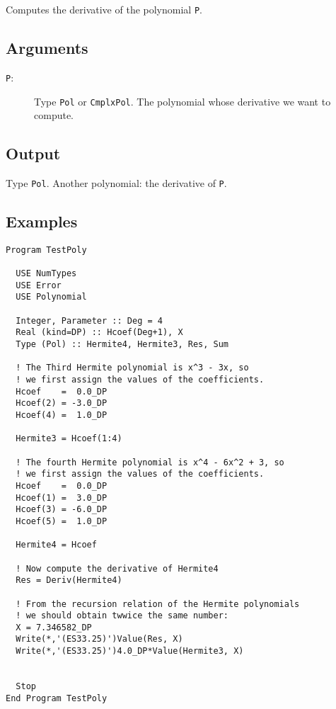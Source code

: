 Computes the derivative of the polynomial \texttt{P}.

\subsection{Arguments}

\begin{description}
\item[\texttt{P}:] Type \texttt{Pol} or \texttt{CmplxPol}. The
  polynomial whose derivative we want to compute.
\end{description}

\subsection{Output}

Type \texttt{Pol}. Another polynomial: the derivative of \texttt{P}.

\subsection{Examples}

\begin{lstlisting}[emph=Deriv,
                   emphstyle=\color{blue},
                   frame=trBL,
                   caption=Computing the derivative of a polynomial.,
                   label=derivpol]
Program TestPoly

  USE NumTypes
  USE Error
  USE Polynomial

  Integer, Parameter :: Deg = 4
  Real (kind=DP) :: Hcoef(Deg+1), X
  Type (Pol) :: Hermite4, Hermite3, Res, Sum

  ! The Third Hermite polynomial is x^3 - 3x, so
  ! we first assign the values of the coefficients.
  Hcoef    =  0.0_DP
  Hcoef(2) = -3.0_DP
  Hcoef(4) =  1.0_DP

  Hermite3 = Hcoef(1:4)

  ! The fourth Hermite polynomial is x^4 - 6x^2 + 3, so
  ! we first assign the values of the coefficients.
  Hcoef    =  0.0_DP
  Hcoef(1) =  3.0_DP
  Hcoef(3) = -6.0_DP
  Hcoef(5) =  1.0_DP

  Hermite4 = Hcoef

  ! Now compute the derivative of Hermite4
  Res = Deriv(Hermite4)

  ! From the recursion relation of the Hermite polynomials 
  ! we should obtain twwice the same number:
  X = 7.346582_DP
  Write(*,'(ES33.25)')Value(Res, X)
  Write(*,'(ES33.25)')4.0_DP*Value(Hermite3, X)
  

  Stop
End Program TestPoly
\end{lstlisting}

